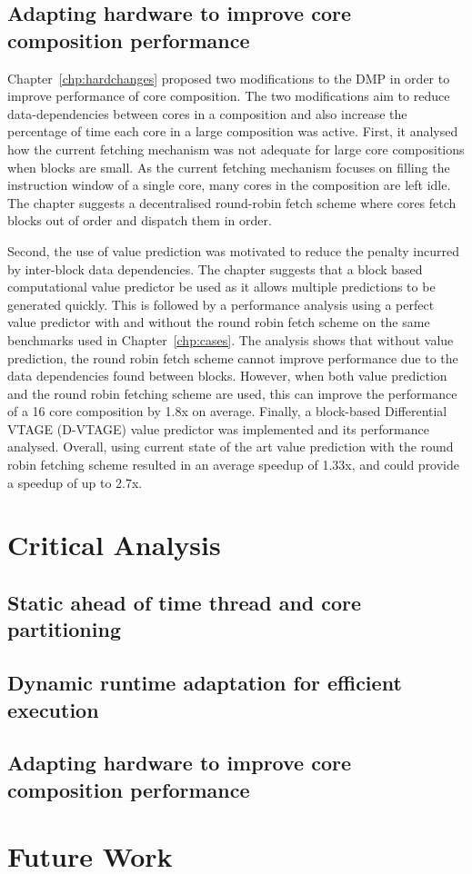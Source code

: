 \subsection{Adapting hardware to improve core composition performance}
Chapter~\ref{chp:hardchanges} proposed two modifications to the DMP in order to improve performance of core composition.
The two modifications aim to reduce data-dependencies between cores in a composition and also increase the percentage of time each core in a large composition was active.
First, it analysed how the current fetching mechanism was not adequate for large core compositions when blocks are small.
As the current fetching mechanism focuses on filling the instruction window of a single core, many cores in the composition are left idle.
The chapter suggests a decentralised round-robin fetch scheme where cores fetch blocks out of order and dispatch them in order.

Second, the use of value prediction was motivated to reduce the penalty incurred by inter-block data dependencies.
The chapter suggests that a block based computational value predictor be used as it allows multiple predictions to be generated quickly.
This is followed by a performance analysis using a perfect value predictor with and without the round robin fetch scheme on the same benchmarks used in Chapter~\ref{chp:cases}.
The analysis shows that without value prediction, the round robin fetch scheme cannot improve performance due to the data dependencies found between blocks.
However, when both value prediction and the round robin fetching scheme are used, this can improve the performance of a 16 core composition by 1.8x on average.
Finally, a block-based Differential VTAGE (D-VTAGE) value predictor was implemented and its performance analysed.
Overall, using current state of the art value prediction with the round robin fetching scheme resulted in an average speedup of 1.33x, and could provide a speedup of up to 2.7x.

\section{Critical Analysis}
\subsection{Static ahead of time thread and core partitioning}
\subsection{Dynamic runtime adaptation for efficient execution}
\subsection{Adapting hardware to improve core composition performance}
\section{Future Work}